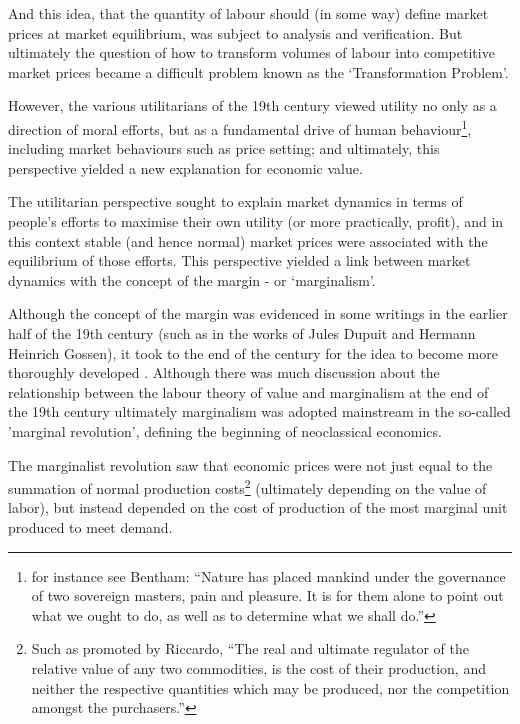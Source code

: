 And this idea, that the quantity of labour should (in some way) define market prices at market equilibrium, was subject to analysis and verification.
But ultimately the question of how to transform volumes of labour into competitive market prices became a difficult problem known as the `Transformation Problem'.

However, the various utilitarians of the 19th century viewed utility no only as a direction of moral efforts, but as a fundamental drive of human behaviour\footnote{for instance see Bentham: ``Nature has placed mankind under the governance of two sovereign masters, pain and pleasure.
It is for them alone to point out what we ought to do, as well as to determine what we shall do.''\cite{bentham1823introduction}}, including market behaviours such as price setting; and ultimately, this perspective yielded a new explanation for economic value.

The utilitarian perspective sought to explain market dynamics in terms of people's efforts to maximise their own utility (or more practically, profit), and in this context stable (and hence normal) market prices were associated with the equilibrium of those efforts.
This perspective yielded a link between market dynamics with the concept of the margin - or `marginalism'.

Although the concept of the margin was evidenced in some writings in the earlier half of the 19th century (such as in the works of Jules Dupuit and Hermann Heinrich Gossen), it took to the end of the century for the idea to become more thoroughly developed \cite{RePEc:ucp:jpolec:v:58:y:1950:p:307}.
Although there was much discussion about the relationship between the labour theory of value and marginalism at the end of the 19th century \cite{steedman2003socialism} ultimately marginalism was adopted mainstream in the so-called 'marginal revolution', defining the beginning of neoclassical economics.\cite{marginalism1}

The marginalist revolution saw that economic prices were not just equal to the summation of normal production costs\footnote{Such as promoted by Riccardo, ``The real and ultimate regulator of the relative value of any two commodities, is the cost of their production, and neither the respective quantities which may be produced, nor the competition amongst the purchasers.''\cite{Riccardo1Gutenberg}} (ultimately depending on the value of labor), but instead depended on the cost of production of the most marginal unit produced to meet demand.


